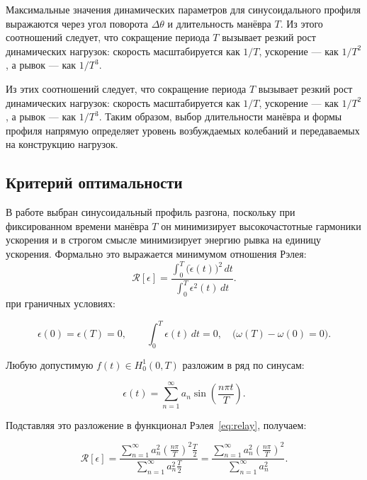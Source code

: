 Максимальные значения динамических параметров для синусоидального профиля выражаются через угол поворота $\Delta \theta$ и длительность манёвра $T$. Из этого соотношений следует, что сокращение периода $T$ вызывает резкий рост динамических нагрузок: скорость масштабируется как $1/T$, ускорение --- как $1/T^2$, а рывок --- как $1/T^3$. 

Из этих соотношений следует, что сокращение периода $T$ вызывает резкий рост динамических нагрузок: скорость масштабируется как $1/T$, ускорение — как $1/T^2$, а рывок — как $1/T^3$. Таким образом, выбор длительности манёвра и формы профиля напрямую определяет уровень возбуждаемых колебаний и передаваемых на конструкцию нагрузок.

\subsection{Критерий оптимальности}

В работе выбран синусоидальный профиль разгона, поскольку при фиксированном времени манёвра $T$ он минимизирует высокочастотные гармоники ускорения и в строгом смысле минимизирует энергию рывка на единицу ускорения. Формально это выражается минимумом отношения Рэлея:
\begin{equation}
	\label{eq:relay}
	\mathcal{R}[\epsilon] =
	\frac{\displaystyle \int_{0}^{T} \bigl(\dot{\epsilon}(t)\bigr)^{2}\,dt}
	{\displaystyle \int_{0}^{T} \epsilon^{2}(t)\,dt}.
	\end{equation}
при граничных условиях:

\begin{equation}
	\epsilon(0) = \epsilon(T) = 0, \qquad
	\int_{0}^{T} \epsilon(t)\,dt = 0, \quad
	\bigl(\omega(T) - \omega(0) = 0\bigr).
\end{equation}

Любую допустимую $f(t) \in H_0^1(0,T)$ разложим в ряд по синусам:

\begin{equation}
	\epsilon(t) = \sum_{n=1}^{\infty} a_{n} \sin\!\left(\frac{n \pi t}{T}\right).
\end{equation}

Подставляя это разложение в функционал Рэлея~\cref{eq:relay}, получаем:

\begin{equation}
	\mathcal{R}[\epsilon] =
	\frac{\displaystyle \sum_{n=1}^{\infty} a_n^2 \left(\frac{n \pi}{T}\right)^2 \frac{T}{2}}
	{\displaystyle \sum_{n=1}^{\infty} a_n^2 \frac{T}{2}}
	=
	\frac{\sum_{n=1}^{\infty} a_n^2 \left(\frac{n \pi}{T}\right)^2}
	{\sum_{n=1}^{\infty} a_n^2}.
\end{equation}

